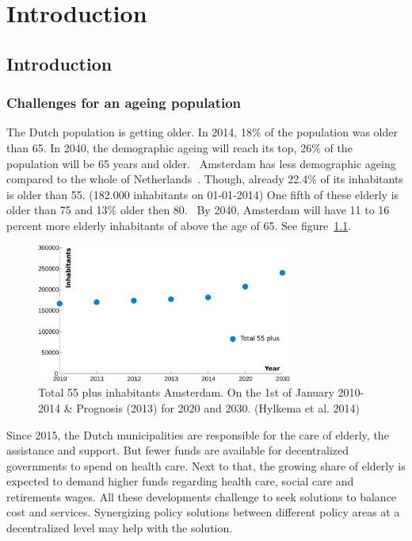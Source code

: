 \chapter[Introduction]{Introduction}
\section[Introduction]{Introduction}
\subsection{Challenges for an ageing population}
The Dutch population is getting older. In 2014, 18\% of the population was older than 65. In 2040, the demographic ageing will reach its top, 26\% of the population will be 65 years and older.~\cite{Hylkema2014} Amsterdam has less demographic ageing compared to the whole of Netherlands~\cite{Hylkema2014}. Though, already 22.4\% of its inhabitants is older than 55. (182.000 inhabitants on 01-01-2014) One fifth of these elderly is older than 75 and 13\% older then 80.~\cite{Hylkema2014} By 2040, Amsterdam will have 11 to 16 percent more elderly inhabitants of above the age of 65. See figure~\ref{demo}.

\begin{figure}[h]
\includegraphics[width=0.75\textwidth]{img/I_number_elderly.pdf}
\centering
\caption[Total 55 plus inhabitants Amsterdam.]{
Total 55 plus inhabitants Amsterdam. On the 1st of January 2010-2014 \& Prognosis (2013) for 2020 and 2030. (Hylkema et al. 2014)} 
\label{demo}
\end{figure} 

Since 2015, the Dutch municipalities are responsible for the care of elderly, the assistance and support. But fewer funds are available for decentralized governments to spend on health care. Next to that, the growing share of elderly is expected to demand higher funds regarding health care, social care and retirements wages. All these developments challenge to seek solutions to balance cost and services. Synergizing policy solutions between different policy areas at a decentralized level may help with the solution.~\cite{Hylkema2014} 

